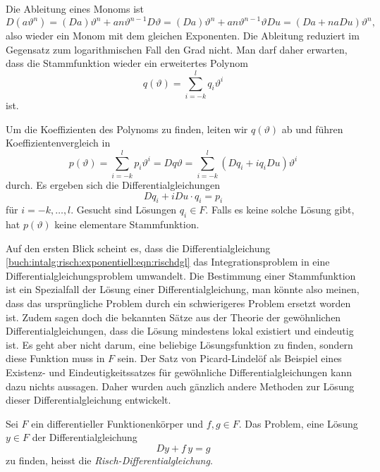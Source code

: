 Die Ableitung eines Monoms ist
\[
D(a\vartheta^n) 
=
(Da)\vartheta^n + an\vartheta^{n-1}D\vartheta
=
(Da)\vartheta^n + an\vartheta^{n-1}\vartheta Du
=
(Da + naDu)\vartheta^n,
\]
also wieder ein Monom mit dem gleichen Exponenten.
Die Ableitung reduziert im Gegensatz zum logarithmischen Fall den
Grad nicht.
Man darf daher erwarten, dass die Stammfunktion wieder ein erweitertes
Polynom
\[
q(\vartheta)
=
\sum_{i=-k}^l q_i\vartheta^i
\]
ist.

Um die Koeffizienten des Polynoms zu finden, leiten wir $q(\vartheta)$
ab und führen Koeffizientenvergleich in
\[
p(\vartheta)
=
\sum_{i=-k}^l p_i\vartheta^i
=
Dq\vartheta
=
\sum_{i=-k}^l
(Dq_i + iq_i Du)\vartheta^i
\]
durch.
Es ergeben sich die Differentialgleichungen
\begin{equation}
Dq_i + iDu\cdot q_i = p_i
\label{buch:intalg:risch:exponentiell:eqn:rischdgl}
\end{equation}
für $i =-k,\dots, l$.
Gesucht sind Lösungen $q_i\in F$.
Falls es keine solche Lösung gibt, hat $p(\vartheta)$ keine elementare
Stammfunktion.

Auf den ersten Blick scheint es, dass die Differentialgleichung
\eqref{buch:intalg:risch:exponentiell:eqn:rischdgl}
das Integrationsproblem in eine Differentialgleichungsproblem
umwandelt.
Die Bestimmung einer Stammfunktion ist ein Spezialfall der Lösung
einer Differentialgleichung, man könnte also meinen, dass das
ursprüngliche Problem durch ein schwierigeres Problem ersetzt worden
ist.
Zudem sagen doch die bekannten Sätze aus der Theorie der gewöhnlichen
Differentialgleichungen, dass die Lösung mindestens lokal existiert
und eindeutig ist.
Es geht aber nicht darum, eine beliebige Lösungsfunktion zu finden,
sondern diese Funktion muss in $F$ sein.
Der Satz von Picard-Lindelöf als Beispiel eines Existenz- und
Eindeutigkeitssatzes für gewöhnliche Differentialgleichungen
kann dazu nichts aussagen.
Daher wurden auch gänzlich andere Methoden zur Lösung dieser
Differentialgleichung entwickelt.

\begin{definition}
Sei $F$ ein differentieller Funktionenkörper und $f,g\in F$.
Das Problem, eine Lösung $y\in F$ der Differentialgleichung
\[
Dy + f\, y = g
\]
zu finden, heisst die \emph{Risch-Differentialgleichung}.
\end{definition}

